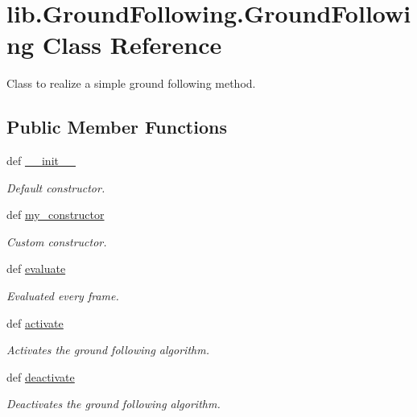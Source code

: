 \hypertarget{classlib_1_1GroundFollowing_1_1GroundFollowing}{\section{lib.\-Ground\-Following.\-Ground\-Following \-Class \-Reference}
\label{classlib_1_1GroundFollowing_1_1GroundFollowing}
}


\-Class to realize a simple ground following method.  


\subsection*{\-Public \-Member \-Functions}
\begin{DoxyCompactItemize}
\item 
def \hyperlink{classlib_1_1GroundFollowing_1_1GroundFollowing_a6ab95d63abff68cb58f2217267b03270}{\-\_\-\-\_\-init\-\_\-\-\_\-}
\begin{DoxyCompactList}\small\item\em \-Default constructor. \end{DoxyCompactList}\item 
def \hyperlink{classlib_1_1GroundFollowing_1_1GroundFollowing_a71388dac8f9da5b43c5944cf304206a2}{my\-\_\-constructor}
\begin{DoxyCompactList}\small\item\em \-Custom constructor. \end{DoxyCompactList}\item 
def \hyperlink{classlib_1_1GroundFollowing_1_1GroundFollowing_a6d9282f78e918b6bfe61bc9cd96938f8}{evaluate}
\begin{DoxyCompactList}\small\item\em \-Evaluated every frame. \end{DoxyCompactList}\item 
def \hyperlink{classlib_1_1GroundFollowing_1_1GroundFollowing_ab4ea027ca20128d4f0fd9dc6561dbf3c}{activate}
\begin{DoxyCompactList}\small\item\em \-Activates the ground following algorithm. \end{DoxyCompactList}\item 
def \hyperlink{classlib_1_1GroundFollowing_1_1GroundFollowing_addc4f0818838bd32a5a9baf19095f677}{deactivate}
\begin{DoxyCompactList}\small\item\em \-Deactivates the ground following algorithm. \end{DoxyCompactList}\end{DoxyCompactItemize}
